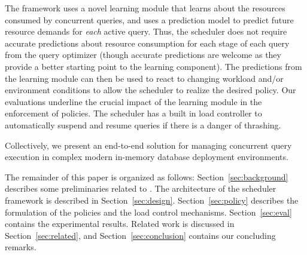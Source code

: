 The framework uses a novel learning module that learns about the resources consumed by concurrent queries, and uses a prediction model to predict future resource demands for \textit{each} active query. 
Thus, the scheduler does not require accurate predictions about resource consumption for each stage of each query from the query optimizer (though accurate predictions are welcome as they provide a better starting point to the learning component). 
The predictions from the learning module can then be used to react to changing workload and/or environment conditions to allow the scheduler to realize the desired policy. 
Our evaluations underline the crucial impact of the learning module in the enforcement of policies.
The scheduler has a built in load controller to automatically suspend and resume queries if there is a danger of thrashing.

Collectively, we present an end-to-end solution for managing concurrent query execution in complex modern in-memory database deployment environments.

The remainder of this paper is organized as follows: Section~\ref{sec:background} describes some preliminaries related to \sys{}. 
The architecture of the scheduler framework is described in Section~\ref{sec:design}. 
Section~\ref{sec:policy} describes the  formulation of the policies and the load control mechanisms.
Section~\ref{sec:eval} contains the experimental results. Related work is discussed in Section~\ref{sec:related}, and Section~\ref{sec:conclusion} contains our concluding remarks.


